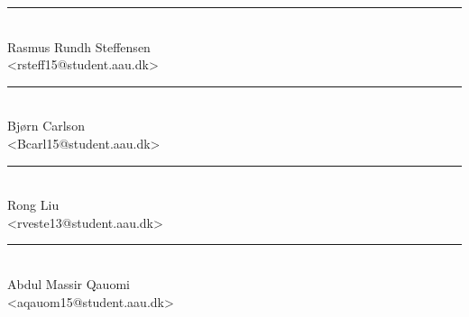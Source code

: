 \noindent
\begin{minipage}[b]{0.45\textwidth}
	\centering
	\rule{\textwidth}{0.5pt}\\
	Rasmus Rundh Steffensen\\
	{\footnotesize <rsteff15@student.aau.dk>}
\end{minipage}
%
\hfill
%
\begin{minipage}[b]{0.45\textwidth}
	\centering
	\rule{\textwidth}{0.5pt}\\
	Bjørn Carlson\\
	{\footnotesize <Bcarl15@student.aau.dk>}
\end{minipage}
\vspace{3\baselineskip}

\noindent
\begin{minipage}[b]{0.45\textwidth}
	\centering
	\rule{\textwidth}{0.5pt}\\
	Rong Liu\\
	{\footnotesize <rveste13@student.aau.dk>}
\end{minipage}
%
\hfill
%
\begin{minipage}[b]{0.45\textwidth}
	\centering
	\rule{\textwidth}{0.5pt}\\
	Abdul Massir Qauomi\\
	{\footnotesize <aqauom15@student.aau.dk>}
\end{minipage}
\vspace{3\baselineskip}
